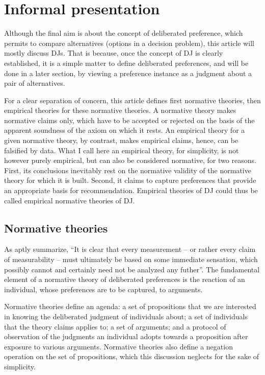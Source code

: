 \documentclass[version=last, pagesize, twoside=off, bibliography=totoc, DIV=calc, fontsize=12pt, a4paper, french, english]{scrartcl}
\begin{document}
\section{Informal presentation}
Although the final aim is about the concept of deliberated preference, which permits to compare alternatives (options in a decision problem), this article will mostly discuss \acp{DJ}. That is because, once the concept of \ac{DJ} is clearly established, it is a simple matter to define deliberated preferences, and will be done in a later section, by viewing a preference instance as a judgment about a pair of alternatives.

For a clear separation of concern, this article defines first normative theories, then empirical theories for these normative theories. A normative theory makes normative claims only, which have to be accepted or rejected on the basis of the apparent soundness of the axiom on which it rests. An empirical theory for a given normative theory, by contrast, makes empirical claims, hence, can be falsified by data. What I call here an empirical theory, for simplicity, is not however purely empirical, but can also be considered normative, for two reasons. First, its conclusions inevitably rest on the normative validity of the normative theory for which it is built. Second, it claims to capture preferences that provide an appropriate basis for recommendation. Empirical theories of \ac{DJ} could thus be called empirical normative theories of \ac{DJ}.

\subsection{Normative theories}
As \citet[p.\ 16]{von_neumann_theory_2004} aptly summarize, “It is clear that every measurement – or rather every claim of measurability – must ultimately be based on some immediate sensation, which possibly cannot and certainly need not be analyzed any futher”. The fundamental element of a normative theory of deliberated preferences is the reaction of an individual, whose preferences are to be captured, to arguments. 

Normative theories define an agenda: a set of propositions that we are interested in knowing the deliberated judgment of individuals about; a set of individuals that the theory claims applies to; a set of arguments; and a protocol of observation of the judgments an individual adopts towards a proposition after exposure to various arguments. Normative theories also define a negation operation on the set of propositions, which this discussion neglects for the sake of simplicity.
\end{document}
